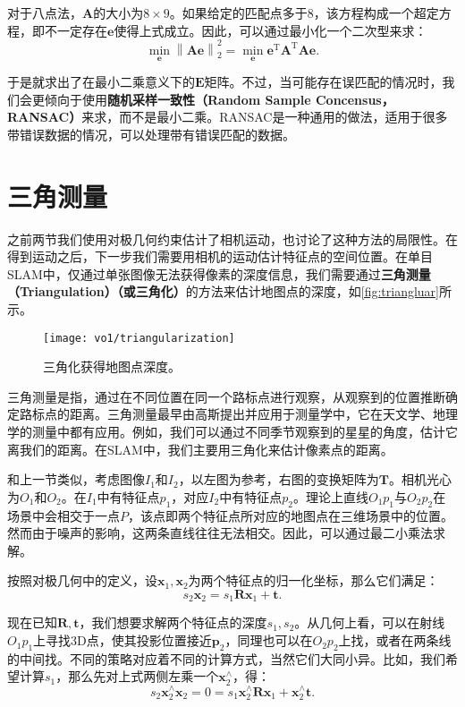 对于八点法，$\bm{A}$的大小为$8 \times 9$。如果给定的匹配点多于$8$，该方程构成一个超定方程，即不一定存在$\bm{e}$使得上式成立。因此，可以通过最小化一个二次型来求：
\begin{equation}
\mathop {\min }\limits_{\bm{e}} \left\| \bm{Ae} \right\|_2^2 = \mathop {\min }\limits_{\bm{e}} { \bm{e}^\mathrm{T}} {\bm{A}^\mathrm{T}} \bm{Ae}.
\end{equation}

于是就求出了在最小二乘意义下的$\bm{E}$矩阵。不过，当可能存在误匹配的情况时，我们会更倾向于使用\textbf{随机采样一致性（Random Sample Concensus，RANSAC）}来求，而不是最小二乘。RANSAC是一种通用的做法，适用于很多带错误数据的情况，可以处理带有错误匹配的数据。

\section{三角测量}
之前两节我们使用对极几何约束估计了相机运动，也讨论了这种方法的局限性。在得到运动之后，下一步我们需要用相机的运动估计特征点的空间位置。在单目SLAM中，仅通过单张图像无法获得像素的深度信息，我们需要通过\textbf{三角测量（Triangulation）（或三角化）}的方法来估计地图点的深度，如\autoref{fig:triangluar}所示。

\begin{figure}[!ht]
	\centering
	\texttt{[image: vo1/triangularization]}
	\caption{三角化获得地图点深度。}
	\label{fig:triangluar}
\end{figure}

三角测量是指，通过在不同位置在同一个路标点进行观察，从观察到的位置推断确定路标点的距离。三角测量最早由高斯提出并应用于测量学中，它在天文学、地理学的测量中都有应用。例如，我们可以通过不同季节观察到的星星的角度，估计它离我们的距离。在SLAM中，我们主要用三角化来估计像素点的距离。

和上一节类似，考虑图像$I_{1}$和$I_{2}$，以左图为参考，右图的变换矩阵为$\bm{T}$。相机光心为$O_{1}$和$O_{2}$。在$I_{1}$中有特征点$p_{1}$，对应$I_{2}$中有特征点$p_{2}$。理论上直线$O_{1}p_{1}$与$O_{2}p_{2}$在场景中会相交于一点$P$，该点即两个特征点所对应的地图点在三维场景中的位置。然而由于噪声的影响，这两条直线往往无法相交。因此，可以通过最二小乘法求解。

按照对极几何中的定义，设$\bm{x}_1, \bm{x}_2$为两个特征点的归一化坐标，那么它们满足：
\begin{equation}
s_2 \bm{x}_2 = s_1  \bm{R} \bm{x}_1 + \bm{t}.  
\end{equation}

现在已知$\bm{R}, \bm{t}$，我们想要求解两个特征点的深度$s_1, s_2$。从几何上看，可以在射线$O_1 p_1$上寻找3D点，使其投影位置接近$\bm{p}_2$，同理也可以在$O_2 p_2$上找，或者在两条线的中间找。不同的策略对应着不同的计算方式，当然它们大同小异。比如，我们希望计算$s_1$，那么先对上式两侧左乘一个$\bm{x}_2^\wedge$，得：
\begin{equation}
\label{eq:x1tox2}
s_2 \bm{x}_2^\wedge \bm{x}_2 = 0 = s_1 \bm{x}_2^\wedge \bm{R} \bm{x}_1 + \bm{x}_2^\wedge \bm{t}. 
\end{equation}

